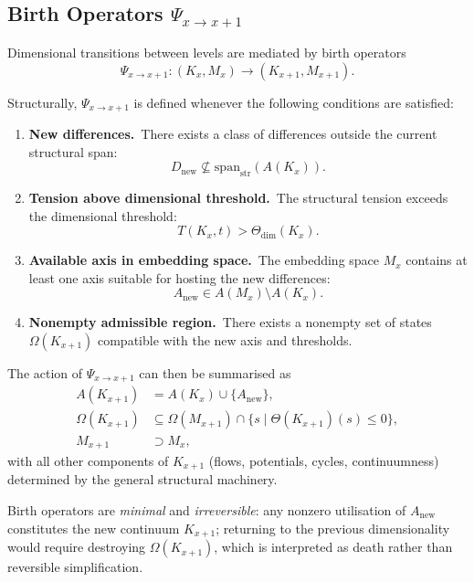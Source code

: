 \subsection{Birth Operators \texorpdfstring{$\Psi_{x\to x+1}$}{Psi\_x→x+1}}
\label{sec:birth-operators}

Dimensional transitions between levels are mediated by birth operators
\[
  \Psi_{x\to x+1} : (K_x, M_x) \longrightarrow (K_{x+1}, M_{x+1}).
\]

Structurally, \(\Psi_{x\to x+1}\) is defined whenever the following conditions
are satisfied:
\begin{enumerate}
  \item \textbf{New differences.}\ 
        There exists a class of differences outside the current structural
        span:
        \[
          D_{\mathrm{new}}\not\subseteq
          \mathrm{span}_{\mathrm{str}}(A(K_x)).
        \]
  \item \textbf{Tension above dimensional threshold.}\ 
        The structural tension exceeds the dimensional threshold:
        \[
          T(K_x,t) > \Theta_{\mathrm{dim}}(K_x).
        \]
  \item \textbf{Available axis in embedding space.}\ 
        The embedding space \(M_x\) contains at least one axis suitable for
        hosting the new differences:
        \[
          A_{\mathrm{new}} \in A(M_x) \setminus A(K_x).
        \]
  \item \textbf{Nonempty admissible region.}\ 
        There exists a nonempty set of states \(\Omega(K_{x+1})\) compatible
        with the new axis and thresholds.
\end{enumerate}

The action of \(\Psi_{x\to x+1}\) can then be summarised as
\begin{align*}
  A(K_{x+1})      &= A(K_x) \cup \{A_{\mathrm{new}}\}, \\
  \Omega(K_{x+1}) &\subseteq
     \Omega(M_{x+1}) \cap
     \big\{ s \mid \Theta(K_{x+1})(s) \le 0 \big\}, \\
  M_{x+1}         &\supset M_x,
\end{align*}
with all other components of \(K_{x+1}\) (flows, potentials, cycles,
continuumness) determined by the general structural machinery.

Birth operators are \emph{minimal} and \emph{irreversible}:
any nonzero utilisation of \(A_{\mathrm{new}}\) constitutes the new continuum
\(K_{x+1}\); returning to the previous dimensionality would require destroying
\(\Omega(K_{x+1})\), which is interpreted as death rather than reversible
simplification.

